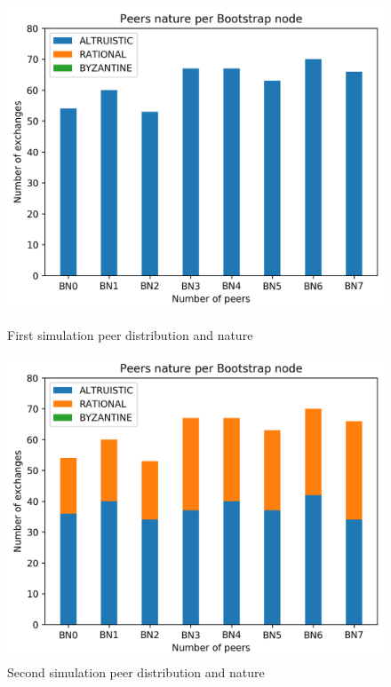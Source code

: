 \documentclass[mscthesis]{usiinfthesis}
\begin{document}
\begin{figure}[!htb]
   \begin{minipage}{0.48\textwidth}
     \centering
     \includegraphics[width=\linewidth]{images/1/1-peer-nature-per-bn.png}
     \caption{First simulation peer distribution and nature}
     \label{fig:sim-one-init-distribution}
   \end{minipage}\hfill
   \begin{minipage}{0.48\textwidth}
     \centering
     \includegraphics[width=\linewidth]{images/2/two-peer-nature-per-bn.png}
     \caption{Second simulation peer distribution and nature}
     \label{fig:sim-two-init-distribution}
   \end{minipage}
\end{figure}
\end{document}
